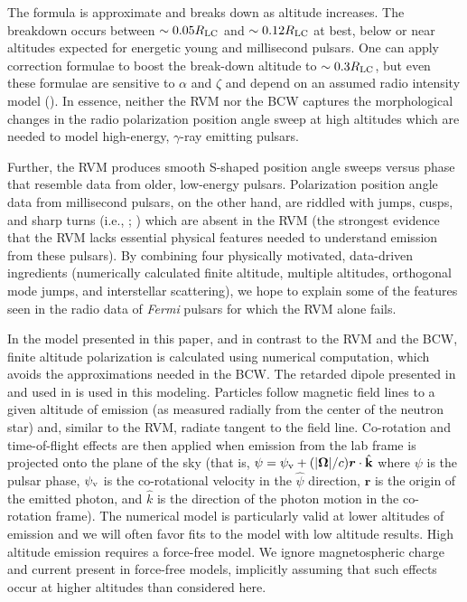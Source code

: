 The formula is approximate and breaks down as altitude increases.  The
breakdown occurs between $\sim 0.05R_{\rm{LC}}$ and $\sim 0.12R_{\rm{LC}}$
at best, below or near altitudes expected for energetic young and
millisecond pulsars.  One can apply correction
formulae to boost the break-down altitude to $\sim 0.3R_{\rm{LC}}$,
but even these formulae are sensitive to $\alpha$ and $\zeta$
and depend on an assumed radio intensity model (\citealp{craig2012altitude}).
In essence, neither the RVM nor the BCW captures the morphological changes
in the radio polarization position angle sweep at
high altitudes which are needed to model high-energy, $\gamma$-ray emitting pulsars.

Further, the RVM produces smooth S-shaped position angle sweeps
versus phase that resemble data from older, low-energy
pulsars.  Polarization position angle data from millisecond pulsars,
on the other hand, are riddled with jumps, cusps, and sharp turns
(i.e., \citealp{yan2011polarization}; \citealp{everett2001emission})
which are absent in the RVM (the strongest
evidence that the RVM lacks essential physical features
needed to understand emission from these pulsars).  By combining
four physically motivated, data-driven ingredients (numerically calculated
finite altitude, multiple altitudes, orthogonal mode jumps, and interstellar
scattering), we hope to explain some of the features seen in the radio data
of \textit{Fermi} pulsars for which the RVM alone fails.

In the model presented in this paper, and in contrast to the RVM and the BCW, 
finite altitude polarization is calculated using
numerical computation, which avoids the approximations needed in the BCW. 
The retarded dipole presented in \cite{kaburaki1980determination} and used in \cite{Watters:2010jb}
is used in this modeling.  Particles follow magnetic field lines
to a given altitude of emission (as measured radially from the center of the 
neutron star) and, similar to the RVM, radiate tangent to the
field line.  Co-rotation and time-of-flight effects are then applied when emission from the lab
frame is projected onto the plane of the sky 
(that is, $\psi=\psi_{\rm v}+(|\boldsymbol{\Omega}|/c) \boldsymbol{r}\cdot\hat{k}$
where $\psi$ is the pulsar phase, $\psi_{\rm v}$ is the co-rotational velocity in the $\hat{\psi}$ direction, $\boldsymbol{r}$ is the 
origin of the emitted photon, and $\hat{k}$ is the direction of the photon motion in the co-rotation frame).  The numerical model is particularly valid
at lower altitudes of emission and we will often favor fits to the model with
low altitude results.  High altitude emission requires a force-free model.  We ignore magnetospheric charge and current present in force-free
models, implicitly assuming that such effects occur at higher altitudes than considered here.

